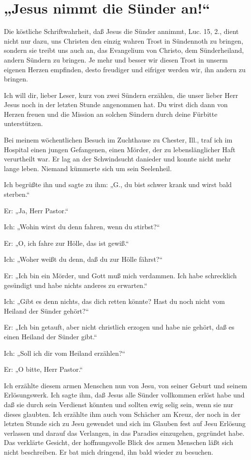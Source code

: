 \chapter[Jesus nimmt die Sünder an!]{„Jesus nimmt die Sünder an!“}

Die köstliche Schriftwahrheit, daß Jesus die Sünder annimmt, Luc. 15, 2., dient nicht nur dazu, uns Christen den einzig wahren Trost in Sündennoth zu bringen, sondern sie treibt uns auch an, das Evangelium von Christo, dem Sünderheiland, andern Sündern zu bringen. Je mehr und besser wir diesen Trost in unserm eigenen Herzen empfinden, desto freudiger und eifriger werden wir, ihn andern zu bringen.

Ich will dir, lieber Leser, kurz von zwei Sündern erzählen, die unser lieber Herr Jesus noch in der letzten Stunde angenommen hat. Du wirst dich dann von Herzen freuen und die Mission an solchen Sündern durch deine Fürbitte unterstützen.

Bei meinem wöchentlichen Besuch im Zuchthause zu Chester, Ill., traf ich im Hospital einen jungen Gefangenen, einen Mörder, der zu lebenslänglicher Haft verurtheilt war. Er lag an der Schwindsucht danieder und konnte nicht mehr lange leben. Niemand kümmerte sich um sein Seelenheil.

Ich begrüßte ihn und sagte zu ihm: „G., du bist schwer krank und wirst bald sterben.“

Er: „Ja, Herr Pastor.“

Ich: „Wohin wirst du denn fahren, wenn du stirbst?“

Er: „O, ich fahre zur Hölle, das ist gewiß.“

Ich: „Woher weißt du denn, daß du zur Hölle fährst?“

Er: „Ich bin ein Mörder, und Gott muß mich verdammen. Ich habe schrecklich gesündigt und habe nichts anderes zu erwarten.“

Ich: „Gibt es denn nichts, das dich retten könnte? Hast du noch nicht vom Heiland der Sünder gehört?“

Er: „Ich bin getauft, aber nicht christlich erzogen und habe nie gehört, daß es einen Heiland der Sünder gibt.“

Ich: „Soll ich dir vom Heiland erzählen?“

Er: „O bitte, Herr Pastor.“

Ich erzählte diesem armen Menschen nun von Jesu, von seiner Geburt und seinem Erlösungswerk. Ich sagte ihm, daß Jesus alle Sünder vollkommen erlöst habe und daß sie durch sein Verdienst könnten und sollten ewig selig sein, wenn sie nur dieses glaubten. Ich erzählte ihm auch vom Schächer am Kreuz, der noch in der letzten Stunde sich zu Jesu gewendet und sich im Glauben fest auf Jesu Erlösung verlassen und darauf das Verlangen, in das Paradies einzugehen, gegründet habe. Das verklärte Gesicht, der hoffnungsvolle Blick des armen Menschen läßt sich nicht beschreiben. Er bat mich dringend, ihn bald wieder zu besuchen.

